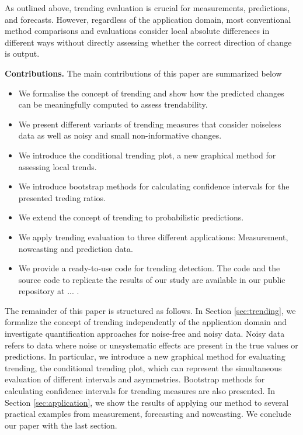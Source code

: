 As outlined above, trending evaluation is crucial for measurements, predictions, and forecasts. 
However, regardless of the application domain, most conventional method comparisons and evaluations consider local absolute differences in different ways without directly assessing whether the correct direction of change is output. 

\textbf{Contributions.} The main contributions of this paper are summarized below
\begin{itemize}

\item We formalise the concept of trending and show how the predicted changes can be meaningfully computed to assess trendability. 

\item We present different variants of trending measures that consider noiseless data as well as noisy and small non-informative changes.

\item We introduce the conditional trending plot, a new graphical method for assessing local trends.

\item We introduce bootstrap methods for calculating  confidence intervals for the presented treding ratios.

\item We extend the concept of trending to probabilistic predictions.

\item We apply trending evaluation to three different applications: Measurement, nowcasting and prediction data. 

\item We provide a ready-to-use code for trending detection. The code and the source code to replicate the results of our study are available in our public repository at ... .
\end{itemize}

The remainder of this paper is structured as follows. 
In Section \ref{sec:trending}, we formalize the concept of trending independently of the application domain and investigate quantification approaches for noise-free and noisy data. Noisy data refers to data where noise or unsystematic effects are present in the true values or predictions.
In particular, we introduce a new graphical method for evaluating trending, the conditional trending plot, which can represent the simultaneous evaluation of different intervals and asymmetries. 
Bootstrap methods for calculating confidence intervals for trending measures are also presented. 
In Section \ref{sec:application}, we show the results of applying our method to several practical examples from measurement, forecasting and nowcasting. 
We conclude our paper with the last section.
